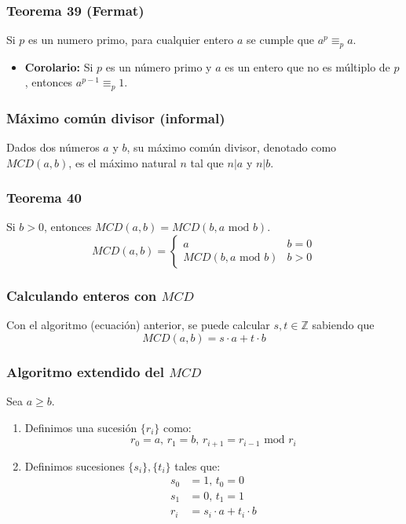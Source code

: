 \begin{multicols}{2}
    \subsubsection*{Teorema 39 (Fermat)}
    Si $p$ es un numero primo, para cualquier entero $a$ se cumple que $a^p \equiv_p a$.
    \begin{itemize}
        \item \textbf{Corolario:} Si $p$ es un número primo y $a$ es un entero que no es múltiplo de $p$, entonces $a^{p - 1} \equiv_p 1$.
    \end{itemize}
    
    \subsubsection*{Máximo común divisor (informal)}
    Dados dos números $a$ y $b$, su máximo común divisor, denotado como $MCD(a,b)$, es el máximo natural $n$ tal que $n|a$ y $n|b$.
    
    \subsubsection*{Teorema 40}
    Si $b > 0$, entonces $MCD(a,b) = MCD(b, a \text{ mod } b)$.
    $$
    MCD(a,b) = \begin{cases}
    a &b = 0 \\
    MCD(b, a \text{ mod } b) &b > 0
    \end{cases}
    $$
    
    \subsubsection*{Calculando enteros con $MCD$}
    Con el algoritmo (ecuación) anterior, se puede calcular $s,t \in \mathbb{Z}$ sabiendo que
    $$
    MCD(a,b) = s \cdot a + t \cdot b
    $$ 
    
    \subsubsection*{Algoritmo extendido del $MCD$}
    Sea $a \geq b$.
    \begin{enumerate}
        \item Definimos una sucesión $\{ r_i \}$ como:
        $$
        r_0 = a, \, r_1 = b, \, r_{i + 1} = r_{i - 1} \text{ mod } r_i
        $$
        
        \item Definimos sucesiones $\{s_i\}, \{t_i\}$ tales que:
        \begin{align*}
            s_0 &= 1,\,t_0 = 0 \\
            s_1 &= 0, \, t_1 = 1 \\
            r_i &= s_i \cdot a + t_i \cdot b
        \end{align*}
        

\end{enumerate}
\end{multicols}

